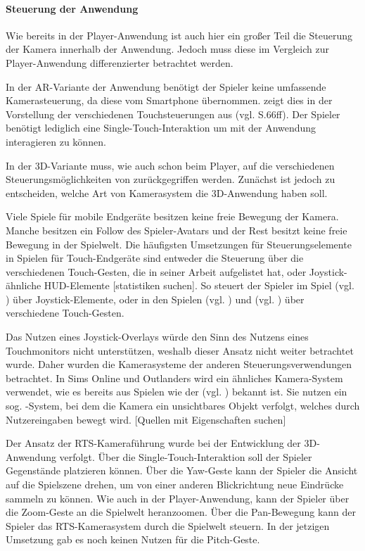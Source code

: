 \paragraph{Steuerung der Anwendung}
Wie bereits in der Player-Anwendung ist auch hier ein großer Teil die Steuerung der Kamera innerhalb der Anwendung. Jedoch muss diese im Vergleich zur Player-Anwendung differenzierter betrachtet werden. 

In der \ac{AR}-Variante der Anwendung benötigt der Spieler keine umfassende Kamerasteuerung, da diese vom Smartphone  übernommen. \cite{reinhard_augmented_2022} zeigt dies in der Vorstellung der verschiedenen Touchsteuerungen aus (vgl. S.66ff). Der Spieler benötigt lediglich eine Single-Touch-Interaktion um mit der Anwendung interagieren zu können.

In der \ac{3D}-Variante muss, wie auch schon beim Player, auf die verschiedenen Steuerungsmöglichkeiten von \cite{reinhard_augmented_2022} zurückgegriffen werden. Zunächst ist jedoch zu entscheiden, welche Art von Kamerasystem die \ac{3D}-Anwendung haben soll. 

Viele Spiele für mobile Endgeräte besitzen keine freie Bewegung der Kamera. Manche besitzen ein Follow des Spieler-Avatars und der Rest besitzt keine freie Bewegung in der Spielwelt. Die häufigsten Umsetzungen für Steuerungselemente in Spielen für Touch-Endgeräte sind entweder die Steuerung über die verschiedenen Touch-Gesten, die \cite{reinhard_augmented_2022} in seiner Arbeit aufgelistet hat, oder Joystick-ähnliche \ac{HUD}-Elemente [statistiken suchen]. 
So steuert der Spieler im Spiel  (vgl. \cite{noauthor_botworld_nodate}) über Joystick-Elemente, oder in den Spielen  (vgl. \cite{arts_sims_2017}) und  (vgl. \cite{noauthor_outlanders_2025}) über verschiedene Touch-Gesten. 

Das Nutzen eines Joystick-Overlays würde den Sinn des Nutzens eines Touchmonitors nicht unterstützen, weshalb dieser Ansatz nicht weiter betrachtet wurde. Daher wurden die Kamerasysteme der anderen Steuerungsverwendungen betrachtet. In Sims Online und Outlanders wird ein ähnliches Kamera-System verwendet, wie es bereits aus Spielen wie der  (vgl. \cite{noauthor_ubisoft_nodate}) bekannt ist. Sie nutzen ein sog. -System, bei dem die Kamera ein unsichtbares Objekt verfolgt, welches durch Nutzereingaben bewegt wird. [Quellen mit Eigenschaften suchen] 

Der Ansatz der \ac{RTS}-Kameraführung wurde bei der Entwicklung der \ac{3D}-Anwendung verfolgt. Über die Single-Touch-Interaktion soll der Spieler Gegenstände platzieren können. Über die Yaw-Geste kann der Spieler die Ansicht auf die Spielszene drehen, um von einer anderen Blickrichtung neue Eindrücke sammeln zu können. Wie auch in der Player-Anwendung, kann der Spieler über die Zoom-Geste an die Spielwelt heranzoomen. Über die Pan-Bewegung kann der Spieler das \ac{RTS}-Kamerasystem durch die Spielwelt steuern. In der jetzigen Umsetzung gab es noch keinen Nutzen für die Pitch-Geste.


